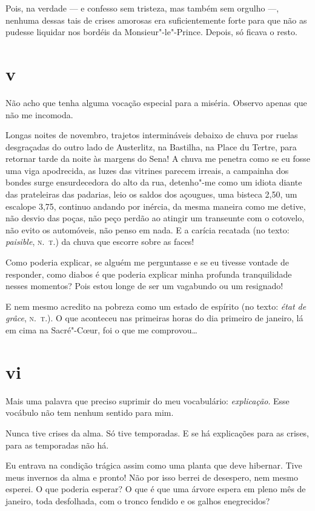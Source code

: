 Pois, na verdade --- e confesso sem tristeza, mas também sem orgulho ---,
nenhuma dessas tais de crises amorosas era suficientemente forte
para que não as pudesse liquidar nos bordéis da Monsieur"-le"-Prince.
Depois, só ficava o resto.

\section{v}

Não acho que tenha alguma vocação especial para a miséria. Observo
apenas que não me incomoda.

Longas noites de novembro, trajetos intermináveis debaixo de
chuva por ruelas desgraçadas do outro lado de Austerlitz, na Bastilha,
na Place du Tertre, para retornar tarde da noite às margens do Sena! A
chuva me penetra como se eu fosse uma viga apodrecida, as luzes das
vitrines parecem irreais, a campainha dos bondes surge ensurdecedora
do alto da rua, detenho"-me como um idiota diante das prateleiras das
padarias, leio os saldos dos açougues, uma bisteca 2,50, um escalope
3,75, continuo andando por inércia, da mesma maneira como me detive, não
desvio das poças, não peço perdão ao atingir um transeunte com o
cotovelo, não evito os automóveis, não penso em nada. E a carícia
recatada (no texto: \emph{paisible}, \textsc{n.~t.}) da chuva que escorre sobre as
faces!

Como poderia explicar, se alguém me perguntasse e se eu tivesse
vontade de responder, como diabos é que poderia explicar minha
profunda tranquilidade nesses momentos? Pois estou longe de ser um
vagabundo ou um resignado!

E nem mesmo acredito na pobreza como um estado de espírito (no texto:
\emph{état de grâce}, \textsc{n.~t.}). O que aconteceu nas primeiras horas do dia
primeiro de janeiro, lá em cima na Sacré"-C\oe ur, foi o que me
comprovou\ldots{}

\section{vi}

Mais uma palavra que preciso suprimir do meu vocabulário:
\emph{explicação}. Esse vocábulo não tem nenhum sentido para mim.

Nunca tive crises da alma. Só tive temporadas. E se há explicações para
as crises, para as temporadas não há.

Eu entrava na condição trágica assim como uma planta que deve hibernar.
Tive meus invernos da alma e pronto! Não por isso berrei de
desespero, nem mesmo esperei. O que poderia esperar? O que é que uma
árvore espera em pleno mês de janeiro, toda desfolhada, com o tronco
fendido e os galhos enegrecidos?

